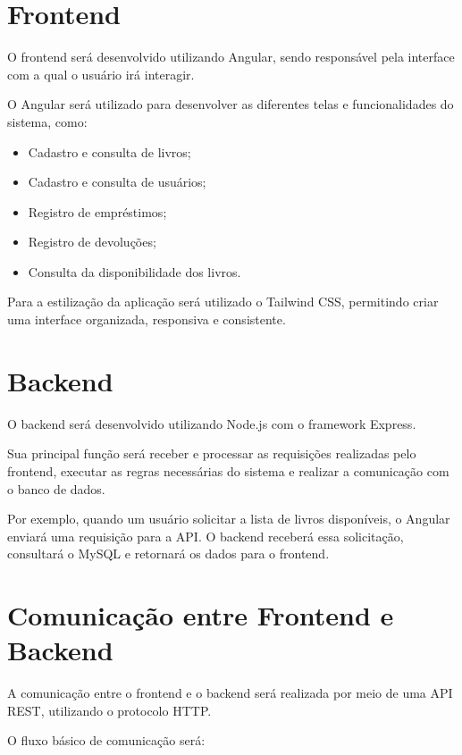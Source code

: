 \documentclass[12pt,a4paper]{article}
\begin{document}
\section{Frontend}

O frontend será desenvolvido utilizando Angular, sendo responsável pela interface com a qual o usuário irá interagir.

O Angular será utilizado para desenvolver as diferentes telas e funcionalidades do sistema, como:

\begin{itemize}
    \item Cadastro e consulta de livros;
    \item Cadastro e consulta de usuários;
    \item Registro de empréstimos;
    \item Registro de devoluções;
    \item Consulta da disponibilidade dos livros.
\end{itemize}

Para a estilização da aplicação será utilizado o Tailwind CSS, permitindo criar uma interface organizada, responsiva e consistente.

\section{Backend}

O backend será desenvolvido utilizando Node.js com o framework Express.

Sua principal função será receber e processar as requisições realizadas pelo frontend, executar as regras necessárias do sistema e realizar a comunicação com o banco de dados.

Por exemplo, quando um usuário solicitar a lista de livros disponíveis, o Angular enviará uma requisição para a API. O backend receberá essa solicitação, consultará o MySQL e retornará os dados para o frontend.

\section{Comunicação entre Frontend e Backend}

A comunicação entre o frontend e o backend será realizada por meio de uma API REST, utilizando o protocolo HTTP.

O fluxo básico de comunicação será:
\end{document}
